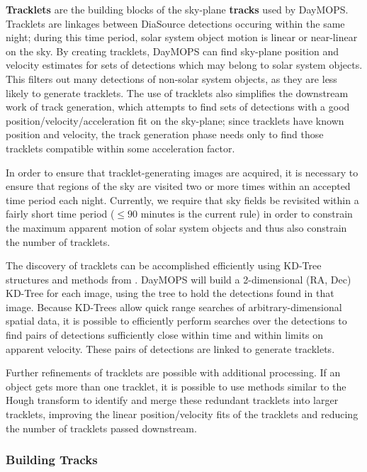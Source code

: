 \documentclass[12pt,preprint]{aastex}
\begin{document}
\textbf{Tracklets} are the building blocks of the sky-plane
\textbf{tracks} used by DayMOPS.  Tracklets are linkages between
DiaSource detections occuring within the same night; during this time
period, solar system object motion is linear or near-linear on the
sky. By creating tracklets, DayMOPS can find sky-plane position and
velocity estimates for sets of detections which may belong to solar
system objects.  This filters out many detections of non-solar system
objects, as they are less likely to generate tracklets.  The use of
tracklets also simplifies the downstream work of track generation,
which attempts to find sets of detections with a good
position/velocity/acceleration fit on the sky-plane; since tracklets
have known position and velocity, the track generation phase needs
only to find those tracklets compatible within some acceleration
factor.

In order to ensure that tracklet-generating images are acquired, it is
necessary to ensure that regions of the sky are visited two or more
times within an accepted time period each night.  Currently, we
require that sky fields be revisited within a fairly short time period
($\leq 90$ minutes is the current rule) in order to constrain the
maximum apparent motion of solar system objects and thus also
constrain the number of tracklets.

The discovery of tracklets can be accomplished efficiently using
KD-Tree structures \citep{bentley_kdtrees} and methods from
\citet{kubica_thesis}.  DayMOPS will build a 2-dimensional (RA, Dec)
KD-Tree for each image, using the tree to hold the detections found in
that image.  Because KD-Trees allow quick range searches of
arbitrary-dimensional spatial data, it is possible to efficiently
perform searches over the detections to find pairs of detections
sufficiently close within time and within limits on apparent
velocity. These pairs of detections are linked to generate tracklets.


Further refinements of tracklets are possible with additional
processing. If an object gets more than one tracklet, it is possible
to use methods similar to the Hough transform to identify and merge
these redundant tracklets into larger tracklets, improving the linear
position/velocity fits of the tracklets and reducing the number of
tracklets passed downstream.

\subsubsection{Building Tracks}
\end{document}
